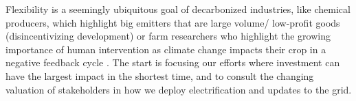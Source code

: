Flexibility is a seemingly ubiquitous goal of decarbonized industries, like
chemical producers, which highlight big emitters that are large volume/
low-profit goods (disincentivizing development)
\cite{mallapragada_decarbonization_2023} or farm researchers who highlight the
growing importance of human intervention as climate change impacts their crop
in a negative feedback cycle \cite{farokhi_soofi_farm_2022}. The start is
focusing our efforts where investment can have the largest impact in the
shortest time, and to consult the changing valuation of stakeholders in how we
deploy electrification and updates to the grid.